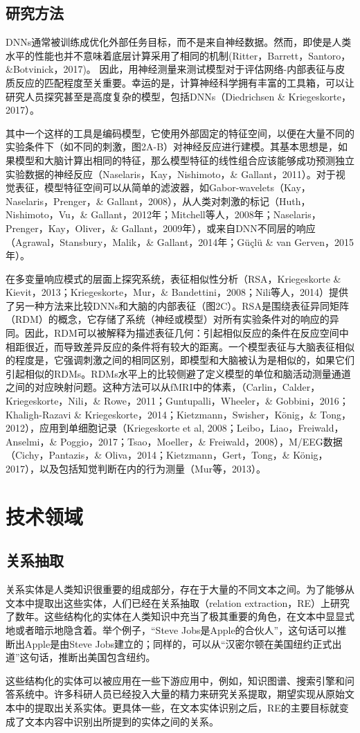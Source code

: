 \documentclass[UTF8,a4paper]{ctexart}
\begin{document}
\subsection{研究方法}
DNNs通常被训练成优化外部任务目标，而不是来自神经数据。然而，即使是人类水平的性能也并不意味着底层计算采用了相同的机制(Ritter，Barrett，Santoro，\&Botvinick，2017)。 因此，用神经测量来测试模型对于评估网络-内部表征与皮质反应的匹配程度至关重要。幸运的是，计算神经科学拥有丰富的工具箱，可以让研究人员探究甚至是高度复杂的模型，包括DNNs（Diedrichsen \& Kriegeskorte，2017）。
\par
其中一个这样的工具是编码模型，它使用外部固定的特征空间，以便在大量不同的实验条件下（如不同的刺激，图2A-B）对神经反应进行建模。其基本思想是，如果模型和大脑计算出相同的特征，那么模型特征的线性组合应该能够成功预测独立实验数据的神经反应（Naselaris，Kay，Nishimoto，\& Gallant，2011）。对于视觉表征，模型特征空间可以从简单的滤波器，如Gabor-wavelets（Kay，Naselaris，Prenger，\& Gallant，2008），从人类对刺激的标记（Huth，Nishimoto，Vu，\& Gallant，2012年；Mitchell等人，2008年；Naselaris，Prenger，Kay，Oliver，\& Gallant，2009年），或来自DNN不同层的响应（Agrawal，Stansbury，Malik，\& Gallant，2014年；Güçlü \& van Gerven，2015年）。
\par
在多变量响应模式的层面上探究系统，表征相似性分析（RSA，Kriegeskorte \& Kievit，2013；Kriegeskorte，Mur，\& Bandettini，2008；Nili等人，2014）提供了另一种方法来比较DNNs和大脑的内部表征（图2C）。RSA是围绕表征异同矩阵（RDM）的概念，它存储了系统（神经或模型）对所有实验条件对的响应的异同。因此，RDM可以被解释为描述表征几何：引起相似反应的条件在反应空间中相距很近，而导致差异反应的条件将有较大的距离。一个模型表征与大脑表征相似的程度是，它强调刺激之间的相同区别，即模型和大脑被认为是相似的，如果它们引起相似的RDMs。RDMs水平上的比较侧避了定义模型的单位和脑活动测量通道之间的对应映射问题。这种方法可以从fMRI中的体素，（Carlin，Calder，Kriegeskorte，Nili，\& Rowe，2011；Guntupalli，Wheeler，\& Gobbini，2016；Khaligh-Razavi \& Kriegeskorte，2014；Kietzmann，Swisher，König，\& Tong，2012），应用到单细胞记录（Kriegeskorte et al, 2008；Leibo，Liao，Freiwald，Anselmi，\& Poggio，2017；Tsao，Moeller，\& Freiwald，2008），M/EEG数据（Cichy，Pantazis，\& Oliva，2014；Kietzmann，Gert，Tong，\& König，2017），以及包括知觉判断在内的行为测量（Mur等，2013）。
\section{技术领域}
\subsection{关系抽取}
关系实体是人类知识很重要的组成部分，存在于大量的不同文本之间。为了能够从文本中提取出这些实体，人们已经在关系抽取（relation extraction，RE）上研究了数年。这些结构化的实体在人类知识中充当了极其重要的角色，在文本中显显式地或者暗示地隐含着。举个例子，“Steve Jobs是Apple的合伙人”，这句话可以推断出Apple是由Steve Jobs建立的；同样的，可以从“汉密尔顿在美国纽约正式出道”这句话，推断出美国包含纽约。
\par
这些结构化的实体可以被应用在一些下游应用中，例如，知识图谱、搜索引擎和问答系统中。许多科研人员已经投入大量的精力来研究关系提取，期望实现从原始文本中的提取出关系实体。更具体一些，在文本实体识别之后，RE的主要目标就变成了文本内容中识别出所提到的实体之间的关系。
\end{document}
